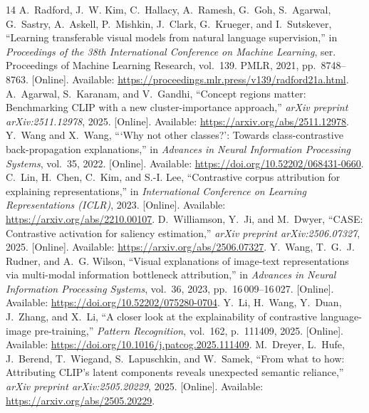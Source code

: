 \begin{thebibliography}{14}
A.~Radford, J.~W. Kim, C.~Hallacy, A.~Ramesh, G.~Goh, S.~Agarwal, G.~Sastry,
A.~Askell, P.~Mishkin, J.~Clark, G.~Krueger, and I.~Sutskever, ``Learning
transferable visual models from natural language supervision,'' in
\emph{Proceedings of the 38th International Conference on Machine Learning},
ser. Proceedings of Machine Learning Research, vol.~139. PMLR, 2021,
pp.~8748--8763. [Online]. Available:
\url{https://proceedings.mlr.press/v139/radford21a.html}.
A.~Agarwal, S.~Karanam, and V.~Gandhi, ``Concept regions matter: Benchmarking
{CLIP} with a new cluster-importance approach,'' \emph{arXiv preprint arXiv:2511.12978},
2025. [Online]. Available:
\url{https://arxiv.org/abs/2511.12978}.
Y.~Wang and X.~Wang, ```Why not other classes?': Towards class-contrastive
back-propagation explanations,'' in \emph{Advances in Neural Information
Processing Systems}, vol.~35, 2022. [Online]. Available:
\url{https://doi.org/10.52202/068431-0660}.
C.~Lin, H.~Chen, C.~Kim, and S.-I. Lee, ``Contrastive corpus attribution for
explaining representations,'' in \emph{International Conference on Learning
Representations (ICLR)}, 2023. [Online]. Available:
\url{https://arxiv.org/abs/2210.00107}.
D.~Williamson, Y.~Ji, and M.~Dwyer, ``{CASE}: Contrastive activation for saliency
estimation,'' \emph{arXiv preprint arXiv:2506.07327}, 2025. [Online]. Available:
\url{https://arxiv.org/abs/2506.07327}.
Y.~Wang, T.~G.~J. Rudner, and A.~G. Wilson, ``Visual explanations of image-text
representations via multi-modal information bottleneck attribution,'' in
\emph{Advances in Neural Information Processing Systems}, vol.~36, 2023,
pp.~16\,009--16\,027. [Online]. Available:
\url{https://doi.org/10.52202/075280-0704}.
Y.~Li, H.~Wang, Y.~Duan, J.~Zhang, and X.~Li, ``A closer look at the explainability
of contrastive language-image pre-training,'' \emph{Pattern Recognition},
vol.~162, p.~111409, 2025. [Online]. Available:
\url{https://doi.org/10.1016/j.patcog.2025.111409}.
M.~Dreyer, L.~Hufe, J.~Berend, T.~Wiegand, S.~Lapuschkin, and W.~Samek, ``From
what to how: Attributing {CLIP}'s latent components reveals unexpected semantic
reliance,'' \emph{arXiv preprint arXiv:2505.20229}, 2025. [Online]. Available:
\url{https://arxiv.org/abs/2505.20229}.

\end{thebibliography}
